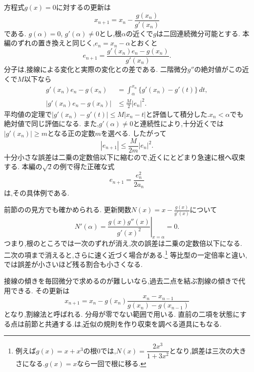 方程式$g(x)=0$に対するの更新は
\[
  x_{n+1}=x_n-\frac{g(x_n)}{g'(x_n)}
\]
である.
$g(\alpha)=0$, $g'(\alpha)\ne0$とし,根$\alpha$の近くで$g$は二回連続微分可能とする.
本編のずれの置き換えと同じく,$e_n=x_n-\alpha$とおくと
\[
  e_{n+1}
  =\frac{g'(x_n)e_n-g(x_n)}{g'(x_n)}.
\]
分子は,接線による変化と実際の変化との差である.
二階微分$g''$の絶対値がこの近くで$M$以下なら
\[
  \begin{aligned}
    g'(x_n)e_n-g(x_n)
    &=\int_\alpha^{x_n}\{g'(x_n)-g'(t)\}\,dt,\\
    |g'(x_n)e_n-g(x_n)|
    &\le \frac{M}{2}|e_n|^2.
  \end{aligned}
\]
平均値の定理で$|g'(x_n)-g'(t)|\le M|x_n-t|$と評価して積分した.$x_n<\alpha$でも絶対値で同じ評価になる.
また,$g'(\alpha)\ne0$と連続性により,十分近くでは$|g'(x_n)|\ge m$となる正の定数$m$を選べる.
したがって
\[
  |e_{n+1}|\le\frac{M}{2m}|e_n|^2.
\]
十分小さな誤差は二乗の定数倍以下に縮むので,近くにとどまり急速に根へ収束する.
本編の$\sqrt2$の例で得た正確な式
\[
  e_{n+1}=\frac{e_n^2}{2a_n}
\]
は,その具体例である.

前節のの見方でも確かめられる.
更新関数$\displaystyle N(x)=x-\frac{g(x)}{g'(x)}$について
\[
  N'(\alpha)
  =\left.\frac{g(x)g''(x)}{g'(x)^2}\right|_{x=\alpha}=0.
\]
つまり,根のところでは一次のずれが消え,次の誤差は二乗の定数倍以下になる.
二次の項まで消えると,さらに速く近づく場合がある.\footnote{例えば$g(x)=x+x^3$の根$0$では,$N(x)=\dfrac{2x^3}{1+3x^2}$となり,誤差は三次の大きさになる.$g(x)=x$なら一回で根に移る.}
等比型の一定倍率と違い,では誤差が小さいほど残る割合も小さくなる.

接線の傾きを毎回微分で求めるのが難しいなら,過去二点を結ぶ割線の傾きで代用できる.
その更新は
\[
  x_{n+1}
  =x_n-g(x_n)\frac{x_n-x_{n-1}}{g(x_n)-g(x_{n-1})}
\]
となり,割線法と呼ばれる.
分母が零でない範囲で用いる.
直前の二項を状態にする点は前節と共通する.は,近似の規則を作り収束を調べる道具にもなる.
